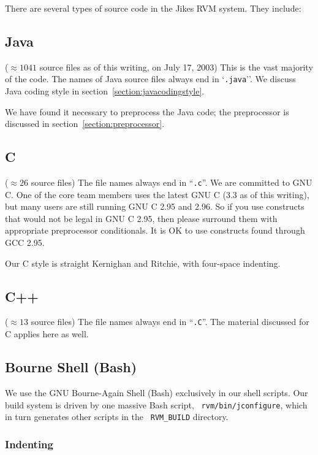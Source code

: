 There are several types of source code in the Jikes RVM system.  They
include:


\subsection{Java} 
($\approx 1041$ source files as of this writing, on July 17, 2003)  This is
the vast majority of the code.  The names of Java source files always end in
`{\tt .java}''.   We discuss Java coding style in
section~\ref{section:javacodingstyle}. 

We have found it necessary to preprocess the Java code; the
preprocessor is discussed in section~\ref{section:preprocessor}.


\subsection {C}

($\approx 26$ source files)  The file names always
end in ``{\tt .c}''.  We are committed to GNU C.  One of the core team
members uses the latest GNU C (3.3 as of this writing), but many users
are still running GNU C 2.95 and 2.96.  So if you use constructs that
would not be legal in GNU C 2.95, then please surround them with
appropriate preprocessor conditionals.  It is OK to use constructs
found through GCC 2.95.

Our C style is straight Kernighan and Ritchie, with four-space
indenting.  

\subsection{C++} 

($\approx 13$ source files)  The file names always end in
``{\tt .C}''.   The material discussed for C applies here as well.

\subsection{Bourne Shell (Bash)}

We use the GNU Bourne-Again Shell (Bash) exclusively in our shell
scripts.  Our build system is driven by one massive Bash script, {\tt
rvm/bin/jconfigure}, which in turn generates other scripts in the {\tt
RVM\_BUILD} directory.

\subsubsection{Indenting}

